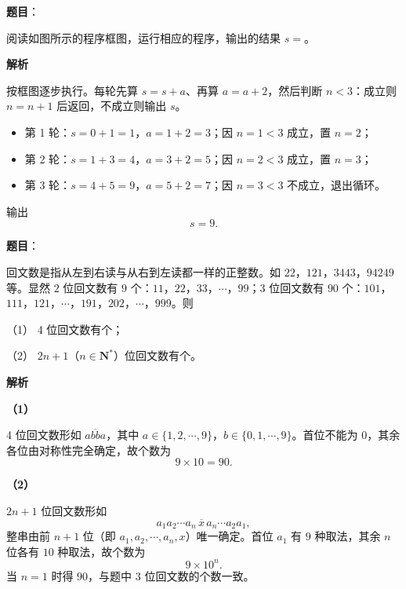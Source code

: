 \begin{answer}

\textbf{题目}：

阅读如图所示的程序框图，运行相应的程序，输出的结果 $s=$\gkblank{}。
\nopagebreak[4]
\begin{center}\end{center}
\nopagebreak[4]
\textbf{解析}

按框图逐步执行。每轮先算 $s=s+a$、再算 $a=a+2$，然后判断 $n<3$：成立则 $n=n+1$ 后返回，不成立则输出 $s$。

\begin{itemize}
\item 第 1 轮：$s=0+1=1$，$a=1+2=3$；因 $n=1<3$ 成立，置 $n=2$；
\item 第 2 轮：$s=1+3=4$，$a=3+2=5$；因 $n=2<3$ 成立，置 $n=3$；
\item 第 3 轮：$s=4+5=9$，$a=5+2=7$；因 $n=3<3$ 不成立，退出循环。
\end{itemize}

输出
\nopagebreak[4]
\[s=9.\]


\end{answer}
\begin{answer}

\textbf{题目}：

回文数是指从左到右读与从右到左读都一样的正整数。如 $22$，$121$，$3443$，$94249$ 等。显然 $2$ 位回文数有 $9$ 个：$11$，$22$，$33$，$\cdots$，$99$；$3$ 位回文数有 $90$ 个：$101$，$111$，$121$，$\cdots$，$191$，$202$，$\cdots$，$999$。则

（1） 4 位回文数有\gkblank{}个；

（2） $2n+1$（$n\in\mathbf N^*$）位回文数有\gkblank{}个。

\textbf{解析}

\textbf{（1）}

4 位回文数形如 $\overline{abba}$，其中 $a\in\{1,2,\cdots,9\}$，$b\in\{0,1,\cdots,9\}$。首位不能为 $0$，其余各位由对称性完全确定，故个数为
\nopagebreak[4]
\[9\times10=90.\]

\textbf{（2）}

$2n+1$ 位回文数形如
\nopagebreak[4]
\[\overline{a_1a_2\cdots a_n\,x\,a_n\cdots a_2a_1},\]
整串由前 $n+1$ 位（即 $a_1,a_2,\cdots,a_n,x$）唯一确定。首位 $a_1$ 有 $9$ 种取法，其余 $n$ 位各有 $10$ 种取法，故个数为
\nopagebreak[4]
\[9\times10^{n}.\]
当 $n=1$ 时得 $90$，与题中 3 位回文数的个数一致。



\end{answer}
